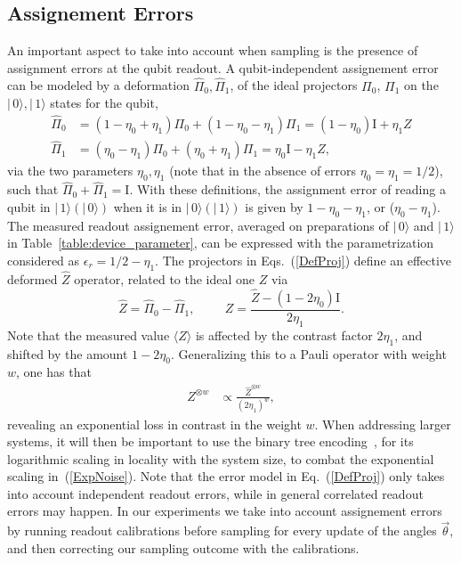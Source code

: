 \documentclass[twocolumn]{revtex4-1}
\newcommand{\be}{\begin{equation}}
\newcommand{\ee}{\end{equation}}
\newcommand{\1}{\mathbbm{1}}
\newcommand{\ket}[1]{ | \, #1 \rangle}
\begin{document}
\subsection{Assignement Errors}
An important aspect to take into account when sampling is the presence of assignment errors at the qubit readout. A qubit-independent assignement error can be modeled by a deformation $\hat{\Pi}_0,\hat{\Pi}_1$, of the ideal projectors $\Pi_0$, $\Pi_1$ on the $\ket{0},\ket{1}$ states for the qubit, 
\begin{align}
\hat{\Pi}_0&=(1-\eta_0+\eta_1)\Pi_0+(1-\eta_0-\eta_1)\Pi_1=(1-\eta_0)\textrm{I}+\eta_1 Z\nonumber\\
\hat{\Pi}_1&=(\eta_0-\eta_1)\Pi_0+(\eta_0+\eta_1)\Pi_1=\eta_0\textrm{I}-\eta_1 Z,\label{DefProj}
\end{align}
via the two parameters $\eta_0,\eta_1$ (note that in the absence of errors $\eta_0=\eta_1=1/2$), such that $\hat{\Pi}_0+\hat{\Pi}_1=\textrm{I}$. With these definitions, the assignment error of reading a qubit in $\ket{1}(\ket{0})$ when it is in $\ket{0}(\ket{1})$ is given by $1-\eta_0-\eta_1$, or ($\eta_0-\eta_1$). The measured readout assignement error, averaged on preparations of $\ket{0}$ and $\ket{1}$  in Table~\ref{table:device_parameter}, can be expressed with the parametrization considered as $\epsilon_r=1/2-\eta_1$. The projectors in Eqs.~(\ref{DefProj}) define an effective deformed $\hat{Z}$ operator, related to the ideal one $Z$ via
\be
\hat{Z}=\hat{\Pi}_0-\hat{\Pi}_1, \hspace{1cm}Z=\frac{\hat{Z}-(1-2\eta_0)\textrm{I}}{2\eta_1}.
\ee  
Note that the measured value $\langle\widehat{ Z }\rangle$ is affected by the contrast factor $2\eta_1$, and shifted by the amount $1-2 \eta_0$. Generalizing  this to a Pauli operator with weight $w$, one has that 
\begin{align}
Z^{\otimes w}&\propto \frac{\hat{Z}^{\otimes w}}{(2\eta_1)^w},\label{ExpNoise}
\end{align}
revealing an exponential loss in contrast in the weight $w$. When addressing larger systems, it will then be important to use the binary tree encoding~\cite{BK2002S}, for its logarithmic scaling in locality with the system size, to combat the exponential scaling in~(\ref{ExpNoise}). Note that the error model in Eq.~(\ref{DefProj}) only takes into account independent readout errors, while in general correlated readout errors may happen. In our experiments we take into account assignement errors by running readout calibrations before sampling for every update of the angles $\vec\theta$, and then correcting our sampling outcome with the calibrations. 
\end{document}
